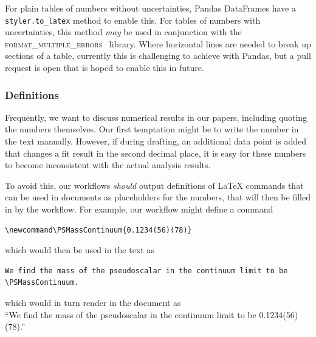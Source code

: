 \documentclass{article}
\newcommand\rfcword[1]{\emph{#1}\xspace}
\newcommand\should{\rfcword{should}}
\newcommand\may{\rfcword{may}}
\newcommand\program[1]{\textsc{#1}\xspace}
\begin{document}
For plain tables of numbers without uncertainties,
Pandas DataFrames have a \verb|styler.to_latex| method to enable this.
For tables of numbers with uncertainties,
this method \may be used in conjunction with
the \program{format\_multiple\_errors}~\cite{fme} library.
Where horizontal lines are needed to break up sections of a table,
currently this is challenging to achieve with Pandas,
but a pull request is open that is hoped to enable this in future.

\subsubsection{Definitions}

Frequently,
we want to discuss numerical results in our papers,
including quoting the numbers themselves.
Our first temptation might be to write the number in the text manually.
However,
if during drafting,
an additional data point is added that changes a fit result in the second decimal place,
it is easy for these numbers to become inconsistent with the actual analysis results.

To avoid this,
our workflows \should output definitions of LaTeX commands
that can be used in documents as placeholders for the numbers,
that will then be filled in by the workflow.
For example,
our workflow might define a command
\begin{verbatim}
\newcommand\PSMassContinuum{0.1234(56)(78)}
\end{verbatim}
which would then be used in the text as
\begin{verbatim}
We find the mass of the pseudoscalar in the continuum limit to be \PSMassContinuum.
\end{verbatim}
which would in turn render in the document as\\
``We find the mass of the pseudoscalar in the continuum limit to be 0.1234(56)(78).''
\end{document}
